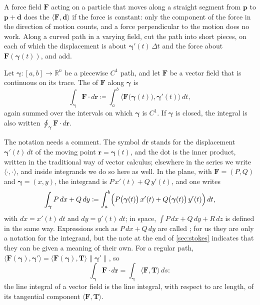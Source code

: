 A force field $\mathbf F$ acting on a particle that moves along a straight segment from $\mathbf p$ to $\mathbf p+\mathbf d$ does the  $\langle\mathbf F,\mathbf d\rangle$ if the force is constant: only the component of the force in the direction of motion counts, and a force perpendicular to the motion does no work. Along a curved path in a varying field, cut the path into short pieces, on each of which the displacement is about $\boldsymbol\gamma'(t)\,\Delta t$ and the force about $\mathbf F(\boldsymbol\gamma(t))$, and add.

\begin{definition}
\label{def:vector-line-integral}
Let $\boldsymbol\gamma\colon[a,b]\to\mathbb R^n$ be a piecewise $C^1$ path, and let $\mathbf F$ be a vector field that is continuous on its trace. The  of $\mathbf F$ along $\boldsymbol\gamma$ is
\[
\int_{\boldsymbol\gamma}\mathbf F\cdot d\mathbf r\coloneqq\int_a^b\bigl\langle\mathbf F\bigl(\boldsymbol\gamma(t)\bigr),\boldsymbol\gamma'(t)\bigr\rangle\,dt ,
\]
again summed over the intervals on which $\boldsymbol\gamma$ is $C^1$. If $\boldsymbol\gamma$ is closed, the integral is also written $\oint_{\boldsymbol\gamma}\mathbf F\cdot d\mathbf r$.
\end{definition}

The notation needs a comment. The symbol $d\mathbf r$ stands for the displacement $\boldsymbol\gamma'(t)\,dt$ of the moving point $\mathbf r=\boldsymbol\gamma(t)$, and the dot is the inner product, written in the traditional way of vector calculus; elsewhere in the series we write $\langle\cdot,\cdot\rangle$, and inside integrands we do so here as well. In the plane, with $\mathbf F=(P,Q)$ and $\boldsymbol\gamma=(x,y)$, the integrand is $P\,x'(t)+Q\,y'(t)$, and one writes
\[
\int_{\boldsymbol\gamma}P\,dx+Q\,dy\coloneqq\int_a^b\Bigl(P\bigl(\boldsymbol\gamma(t)\bigr)\,x'(t)+Q\bigl(\boldsymbol\gamma(t)\bigr)\,y'(t)\Bigr)\,dt ,
\]
with $dx=x'(t)\,dt$ and $dy=y'(t)\,dt$; in space, $\int P\,dx+Q\,dy+R\,dz$ is defined in the same way. Expressions such as $P\,dx+Q\,dy$ are called ; for us they are only a notation for the integrand, but the note at the end of \cref{sec:stokes} indicates that they can be given a meaning of their own. For a regular path, $\langle\mathbf F(\boldsymbol\gamma),\boldsymbol\gamma'\rangle=\langle\mathbf F(\boldsymbol\gamma),\mathbf T\rangle\|\boldsymbol\gamma'\|$, so
\begin{equation}
\int_{\boldsymbol\gamma}\mathbf F\cdot d\mathbf r=\int_{\boldsymbol\gamma}\langle\mathbf F,\mathbf T\rangle\,ds :
\label{eq:tangential-component}
\end{equation}
the line integral of a vector field is the line integral, with respect to arc length, of its tangential component $\langle\mathbf F,\mathbf T\rangle$.

